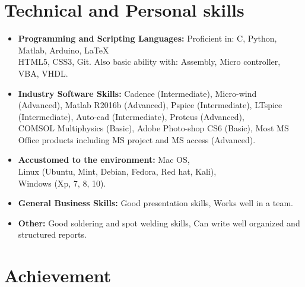 \documentclass[11pt,a4paper,sans]{moderncv}        %
\begin{document}
\section{Technical and Personal skills}

\vspace{6pt}

\begin{itemize}

\item \textbf{Programming and Scripting Languages:} Proficient in: C, Python, Matlab, Arduino, LaTeX \\ HTML5, CSS3, Git. Also basic ability with: Assembly, Micro controller, VBA, VHDL.

\vspace{6pt}

\item \textbf{Industry Software Skills:} Cadence (Intermediate), Micro-wind (Advanced), Matlab R2016b (Advanced), Pspice (Intermediate), LTspice (Intermediate), Auto-cad (Intermediate), Proteus (Advanced), \\COMSOL Multiphysics (Basic), Adobe Photo-shop CS6 (Basic), Most MS Office products including MS project and MS access (Advanced).

\vspace{6pt}

\item \textbf{Accustomed to the environment:} Mac OS,\\ Linux (Ubuntu, Mint, Debian, Fedora, Red hat, Kali), \\ Windows (Xp, 7, 8, 10).

\vspace{6pt}

\item \textbf{General Business Skills:} Good presentation skills, Works well in a team.

\vspace{6pt}

\item \textbf{Other:} Good soldering and spot welding skills, Can write well organized and structured reports.

\end{itemize}

\section{Achievement}

\vspace{6pt}
\end{document}
